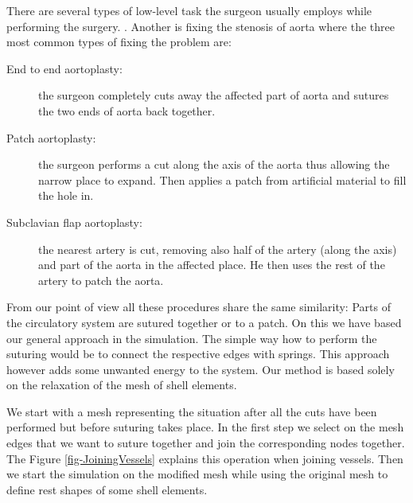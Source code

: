 There are several types of low-level task the surgeon usually employs while
performing the surgery.
%
.
Another is fixing the stenosis of aorta where the three most common types of fixing
the problem are:

\begin{description}

  \item[End to end aortoplasty:] the surgeon completely cuts away the
    affected part of aorta and sutures the two ends of aorta back together.

  \item[Patch aortoplasty:] the surgeon performs a cut along the axis of
    the aorta thus allowing the narrow place to expand. Then applies a
    patch from artificial material to fill the hole in.

  \item[Subclavian flap aortoplasty:] the nearest artery is cut,
    removing also half of the artery (along the axis) and part of the
    aorta in the affected place. He then uses the rest of the artery to
    patch the aorta.

\end{description}

From our point of view all these procedures share the same similarity:
Parts of the circulatory system are sutured together or to a patch. 
On this we have based our general approach in the simulation. 
The simple way how to perform the suturing would be to connect the respective edges with springs. 
This approach however adds some unwanted energy to the system. 
Our method is based solely on the relaxation of the mesh of shell elements.

We start with a mesh representing the situation after all the cuts have been performed but before suturing takes place. 
In the first step we select on the mesh edges that we want to suture together and join the corresponding nodes together. 
The Figure \ref{fig-JoiningVessels} explains this operation when joining vessels. 
Then we start the simulation on the modified mesh while using the original mesh to define rest shapes of some shell elements. 

